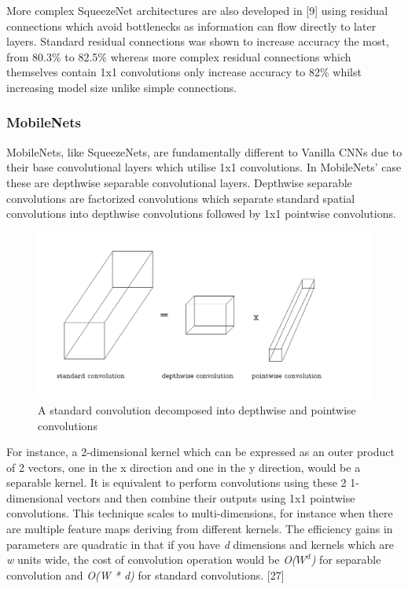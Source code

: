 \documentclass{article}
\begin{document}
More complex SqueezeNet architectures are also developed in [9] using residual connections which avoid bottlenecks as information can flow directly to later layers. Standard residual connections was shown to increase accuracy the most, from 80.3\% to 82.5\% whereas more complex residual connections which themselves contain 1x1 convolutions only increase accuracy to 82\% whilst increasing model size unlike simple connections.\\

\subsubsection{MobileNets}

MobileNets, like SqueezeNets, are fundamentally different to Vanilla CNNs due to their base convolutional layers which utilise 1x1 convolutions. In MobileNets' case these are depthwise separable convolutional layers. Depthwise separable convolutions are factorized convolutions which separate standard spatial convolutions into depthwise convolutions followed by 1x1 pointwise convolutions.\\

\begin{figure}[!b]
  \includegraphics[width=\linewidth]{separableconv.pdf}
  \caption{A standard convolution decomposed into depthwise and pointwise convolutions}
  \label{fig:dwconvolution}
\end{figure}

For instance, a 2-dimensional kernel which can be expressed as an outer product of 2 vectors, one in the x direction and one in the y direction, would be a separable kernel. It is equivalent to perform convolutions using these 2 1-dimensional vectors and then combine their outputs using 1x1 pointwise convolutions. This technique scales to multi-dimensions, for instance when there are multiple feature maps deriving from different kernels. The efficiency gains in parameters are quadratic in that if you have \emph{d} dimensions and kernels which are \emph{w} units wide, the cost of convolution operation would be \emph{O($W^d$)} for separable convolution and \emph{O(W * d)} for standard convolutions. [27] \\
\end{document}
